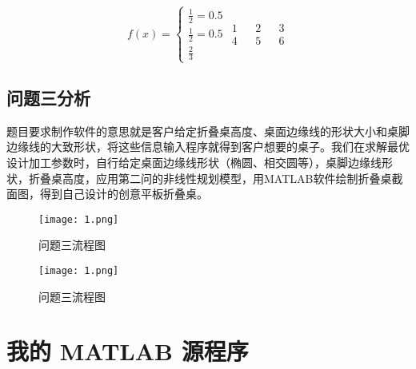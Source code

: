 \documentclass[bwprint]{gmcmthesis}
\begin{document}
\begin{equation}
    f(x) = \begin{cases}
        \frac{1}{2} = 0.5 \\
        \frac{1}{2} = 0.5 \\
        \frac{2}{3}
    \end{cases}\label{asdf}
    \begin{matrix}
        1 && 2 && 3 \\
        4 && 5 && 6
    \end{matrix}
\end{equation}

\subsection{问题三分析}
题目要求制作软件的意思就是客户给定折叠桌高度、桌面边缘线的形状大小和桌脚边缘线的大致形状，将这些信息输入程序就得到客户想要的桌子。我们在求解最优设计加工参数时，自行给定桌面边缘线形状（椭圆、相交圆等），桌脚边缘线形状，折叠桌高度，应用第二问的非线性规划模型，用MATLAB软件绘制折叠桌截面图，得到自己设计的创意平板折叠桌。

\begin{figure}[!htbp]
    \begin{minipage}{0.48\linewidth}
        \centering
        \texttt{[image: 1.png]}
        \caption{问题三流程图}\label{问题}
    \end{minipage}
    \begin{minipage}{0.48\linewidth}
        \centering
        \texttt{[image: 1.png]}
        \caption{问题三流程图}\label{wenti4}
    \end{minipage}
\end{figure}

\newpage
\quad
\newpage





\cite{mittelbach_latex_2004,wright_latex3_2009,beeton_unicode_2008,vieth_experiences_2009}


\newpage
\appendix
\section{我的 MATLAB 源程序}

\end{document}

